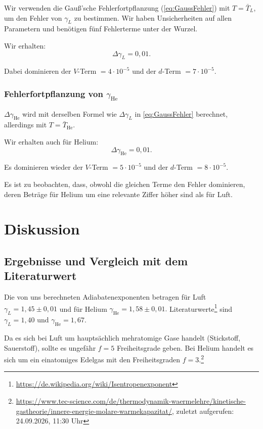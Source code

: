 \documentclass[12pt,a4paper]{article}
\begin{document}
Wir verwenden die Gauß'sche Fehlerfortpflanzung (\cref{eq:GaussFehler}) mit $T=\bar{T}_L$, um den Fehler von $\gamma_L$ zu bestimmen. Wir haben Unsicherheiten auf allen Parametern und benötigen fünf Fehlerterme unter der Wurzel.

Wir erhalten:
\[
\Delta\gamma_L=0{,}01.
\]

Dabei dominieren der $V$-Term $=4\cdot10^{-5}$ und der $d$-Term $=7\cdot10^{-5}$.

\subsubsection{Fehlerfortpflanzung von $\gamma_{\mathrm{He}}$}

$\Delta\gamma_{\mathrm{He}}$ wird mit derselben Formel wie $\Delta\gamma_L$ in \cref{eq:GaussFehler} berechnet, allerdings mit $T=\bar{T}_{\mathrm{He}}$.

Wir erhalten auch für Helium:
\[
\Delta\gamma_{\mathrm{He}}=0{,}01.
\]

Es dominieren wieder der $V$-Term $=5\cdot10^{-5}$ und der $d$-Term $=8\cdot10^{-5}$.

Es ist zu beobachten, dass, obwohl die gleichen Terme den Fehler dominieren, deren Beträge für Helium um eine relevante Ziffer höher sind als für Luft.

\section{Diskussion}

\subsection{Ergebnisse und Vergleich mit dem Literaturwert}

Die von uns berechneten Adiabatenexponenten betragen für Luft
$
\gamma_L=1{,}45\pm0{,}01
$
und für Helium
$
\gamma_{\mathrm{He}}=1{,}58\pm0{,}01.
$ Literaturwerte\footnote{\url{https://de.wikipedia.org/wiki/Isentropenexponent}}
sind
$
\gamma_L=1{,}40
$
und
$
\gamma_{\mathrm{He}}=1{,}67.
$

Da es sich bei Luft um hauptsächlich mehratomige Gase handelt (Stickstoff, Sauerstoff), sollte es ungefähr $f=5$ Freiheitsgrade geben. Bei Helium handelt es sich um ein einatomiges Edelgas mit den Freiheitsgraden $f=3$.\footnote{\url{https://www.tec-science.com/de/thermodynamik-waermelehre/kinetische-gastheorie/innere-energie-molare-warmekapazitat/}, zuletzt aufgerufen: 24.09.2026, 11:30 Uhr}
\end{document}
